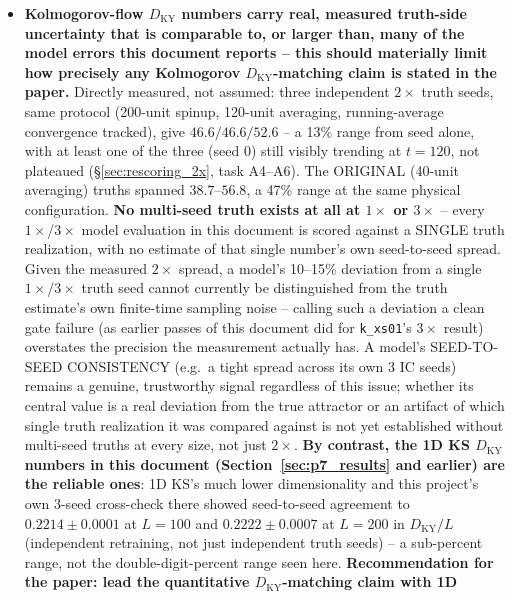 \documentclass[11pt]{article}
\begin{document}
\begin{itemize}[nosep]
  results should be checked against their stated MSE bar
  ($\sim 10^{-10}$--$10^{-12}$ for accurate spectrum reconstruction)
  before any spectral claim in this paper is treated as settled.
\item \textbf{Kolmogorov-flow $D_{\mathrm{KY}}$ numbers carry real,
  measured truth-side uncertainty that is comparable to, or larger than,
  many of the model errors this document reports -- this should
  materially limit how precisely any Kolmogorov $D_{\mathrm{KY}}$-matching
  claim is stated in the paper.} Directly measured, not assumed: three
  independent $2\times$ truth seeds, same protocol (200-unit spinup,
  120-unit averaging, running-average convergence tracked), give
  $46.6/46.6/52.6$ -- a 13\% range from seed alone, with at least one of
  the three (seed 0) still visibly trending at $t{=}120$, not plateaued
  (\S\ref{sec:rescoring_2x}, task A4--A6). The ORIGINAL (40-unit
  averaging) truths spanned $38.7$--$56.8$, a 47\% range at the same
  physical configuration. \textbf{No multi-seed truth exists at all at
  $1\times$ or $3\times$} -- every $1\times$/$3\times$ model evaluation
  in this document is scored against a SINGLE truth realization, with no
  estimate of that single number's own seed-to-seed spread. Given the
  measured $2\times$ spread, a model's 10--15\% deviation from a single
  $1\times$/$3\times$ truth seed cannot currently be distinguished from
  the truth estimate's own finite-time sampling noise -- calling such a
  deviation a clean gate failure (as earlier passes of this document
  did for \texttt{k\_xs01}'s $3\times$ result) overstates the precision
  the measurement actually has. A model's SEED-TO-SEED CONSISTENCY
  (e.g.\ a tight spread across its own 3 IC seeds) remains a genuine,
  trustworthy signal regardless of this issue; whether its central value
  is a real deviation from the true attractor or an artifact of which
  single truth realization it was compared against is not yet
  established without multi-seed truths at every size, not just
  $2\times$. \textbf{By contrast, the 1D KS $D_{\mathrm{KY}}$ numbers in
  this document (Section~\ref{sec:p7_results} and earlier) are the
  reliable ones}: 1D KS's much lower dimensionality and this project's
  own 3-seed cross-check there showed seed-to-seed agreement to
  $0.2214\pm0.0001$ at $L{=}100$ and $0.2222\pm0.0007$ at $L{=}200$ in
  $D_{\mathrm{KY}}/L$ (independent retraining, not just independent
  truth seeds) -- a sub-percent range, not the double-digit-percent
  range seen here. \textbf{Recommendation for the
  paper: lead the quantitative $D_{\mathrm{KY}}$-matching claim with 1D
}
\end{itemize}
\end{document}
